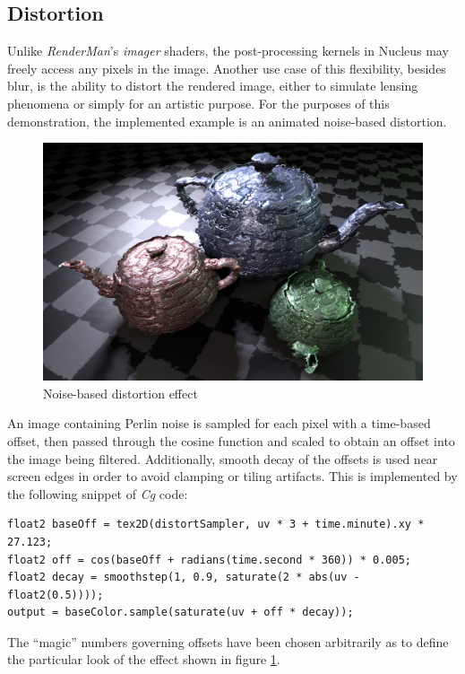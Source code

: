 \subsection{Distortion}

Unlike \emph{RenderMan}'s \emph{imager} shaders, the post-processing kernels in Nucleus may freely access any pixels in the image. Another use case of this flexibility, besides blur, is the ability to distort the rendered image, either to simulate lensing phenomena or simply for an artistic purpose. For the purposes of this demonstration, the implemented example is an animated noise-based distortion.

\begin{figure}[h!]
  \centering
    \includegraphics[width=0.9\linewidth]{./Figures/postProc/distortion.jpg}
    \caption[Distortion]{Noise-based distortion effect}
  \label{fig:postProcDistortion}
\end{figure}

An image containing Perlin noise is sampled for each pixel with a time-based offset, then passed through the cosine function and scaled to obtain an offset into the image being filtered. Additionally, smooth decay of the offsets is used near screen edges in order to avoid clamping or tiling artifacts. This is implemented by the following snippet of \emph{Cg} code:

\begin{lstlisting}[frame=single]
float2 baseOff = tex2D(distortSampler, uv * 3 + time.minute).xy * 27.123;
float2 off = cos(baseOff + radians(time.second * 360)) * 0.005;
float2 decay = smoothstep(1, 0.9, saturate(2 * abs(uv - float2(0.5))));
output = baseColor.sample(saturate(uv + off * decay));
\end{lstlisting}

The ``magic'' numbers governing offsets have been chosen arbitrarily as to define the particular look of the effect shown in figure \ref{fig:postProcDistortion}.

